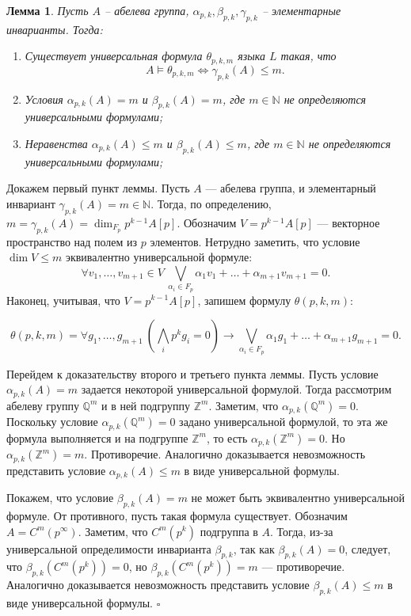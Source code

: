 \documentclass[a4paper,11pt,twoside]{article}
\newtheorem{lemma}{Лемма}[section]
\def\proof{{\noindent{\bf Доказательство.}} }
\def\Z{{\mathbb{Z}}}
\def\N{{\mathbb{N}}}
\def\Q{{\mathbb{Q}}}
\begin{document}
\begin{lemma}\label{lemma:gamma}
Пусть $A$ -- абелева группа, $\alpha_{p,k}, \beta_{p,k}, \gamma_{p,k}$ -- элементарные инварианты. Тогда:
\begin{enumerate}
\item Существует универсальная формула $\theta_{p,k,m}$ языка $L$ такая, что 
$$A \models \theta_{p,k,m} \Leftrightarrow \gamma_{p,k}(A) \leq m.$$
\item Условия $\alpha_{p,k}(A) = m$ и $\beta_{p,k}(A) = m$, где $m \in \N$ не определяются универсальными формулами;
\item Неравенства $\alpha_{p,k}(A) \leq m$ и $\beta_{p,k}(A) \leq m$, где $m \in \N$ не определяются универсальными формулами;
\end{enumerate}
\end{lemma}
\proof Докажем первый пункт леммы. Пусть $A$ --- абелева группа, и элементарный инвариант $\gamma_{p,k}(A) = m \in \N$. Тогда, по определению, $m = \gamma_{p,k} (A) = \dim_{F_p} p^{k-1} A[p]$. Обозначим $V = p^{k-1} A[p]$ --- векторное пространство над полем из $p$ элементов. Нетрудно заметить, что условие $\dim V \leq m$ эквивалентно универсальной формуле: 
$$\forall v_1, \ldots, v_{m+1} \in V \ \bigvee_{\alpha_i \in F_p} \alpha_1v_1 + \ldots + \alpha_{m+1}v_{m+1} = 0.$$
Наконец, учитывая, что $V = p^{k-1}A[p]$, запишем формулу $\theta(p,k,m)$:

$$
\theta(p,k,m) = \forall g_1, \ldots, g_{m+1} \ (\bigwedge_i p^{k}g_{i} = 0) \rightarrow  \bigvee_{\alpha_i \in F_p} \alpha_1g_1 + \ldots + \alpha_{m+1}g_{m+1} = 0.
$$

Перейдем к доказательству второго и третьего пункта леммы. Пусть условие $\alpha_{p,k}(A) = m$ задается некоторой универсальной формулой. Тогда рассмотрим абелеву группу $\Q^m$ и в ней подгруппу $\Z^m$. Заметим, что $\alpha_{p,k}(\Q^m) = 0$. Поскольку условие $\alpha_{p,k}(\Q^m) = 0$ задано универсальной формулой, то эта же формула выполняется и на подгруппе $\Z^m$, то есть $\alpha_{p,k}(\Z^m) = 0$. Но $\alpha_{p,k}(\Z^m) = m$. Противоречие. Аналогично доказывается невозможность представить условие $\alpha_{p,k}(A) \leq m$ в виде универсальной формулы.

Покажем, что условие $\beta_{p,k}(A) = m$ не может быть эквивалентно универсальной формуле. От противного, пусть такая формула существует.  Обозначим $A = C^{m}(p^{\infty})$. Заметим, что $C^{m}(p^k)$ подгруппа в $A$. Тогда, из-за универсальной определимости инварианта $\beta_{p,k}$, так как $\beta_{p,k} (A) = 0$, следует, что $\beta_{p,k} (C^{m}(p^k)) = 0$, но $\beta_{p,k} (C^{m}(p^k)) = m$ --- противоречие. 
Аналогично доказывается невозможность представить условие $\beta_{p,k}(A) \leq m$ в виде универсальной формулы. $\square$
\end{document}
